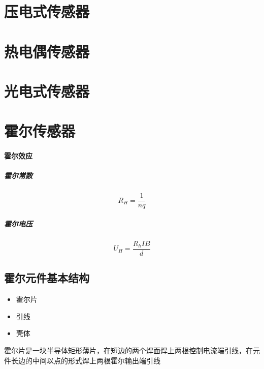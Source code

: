 \documentclass[11pt]{book}
\begin{document}
\section{压电式传感器}

\section{热电偶传感器}

\section{光电式传感器}

\section{霍尔传感器}

\paragraph{霍尔效应}%
\label{par:huo_er_xiao_ying_}

\subparagraph{霍尔常数}%
\label{par:huo_er_chang_shu_}

$$
	R_H = \frac{1}{nq}
$$

\subparagraph{霍尔电压}%
\label{par:huo_er_dian_ya_}

$$
	U_H = \frac{R_h I B}{d} 
$$

\subsection{霍尔元件基本结构}

\begin{itemize}
	\item 霍尔片
	\item 引线
	\item 壳体
\end{itemize}

霍尔片是一块半导体矩形薄片，在短边的两个焊面焊上两根控制电流端引线，在元件长边的中间以点的形式焊上两根霍尔输出端引线
\end{document}
